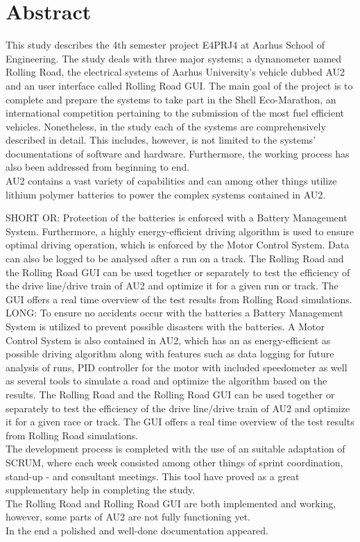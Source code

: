 \chapter{Abstract}
This study describes the 4th semester project E4PRJ4 at Aarhus School of Engineering. The study deals with three major systems; a dynanometer named Rolling Road, the electrical systems of Aarhus University's vehicle dubbed AU2 and an user interface called Rolling Road GUI. The main goal of the project is to complete and prepare the systems to take part in the Shell Eco-Marathon, an international competition pertaining to the submission of the most fuel efficient vehicles. Nonetheless, in the study each of the systems are comprehensively described in detail. This includes, however, is not limited to the systems' documentations of  software and hardware. Furthermore, the working process has also been addressed from beginning to end. \\
AU2 contains a vast variety of capabilities and can among other things utilize lithium polymer batteries to power the complex systems contained in AU2.

SHORT OR:
Protection of the batteries is enforced with a Battery Management System. Furthermore, a highly energy-efficient driving algorithm is used to ensure optimal driving operation, which is enforced by the Motor Control System. Data can also be logged to be analysed after a run on a track.
The Rolling Road and the Rolling Road GUI can be used together or separately to test the efficiency of the drive line/drive train of AU2 and optimize it for a given run or track. The GUI offers a real time overview of the test results from Rolling Road simulations.\\

LONG:
To ensure no accidents occur with the batteries a Battery Management System is utilized to prevent possible disasters with the batteries. A Motor Control System is also contained in AU2, which has an as energy-efficient as possible driving algorithm along with features such as data logging for future analysis of runs, PID controller for the motor with included speedometer as well as several tools to simulate a road and optimize the algorithm based on the results. The Rolling Road and the Rolling Road GUI can be used together or separately to test the efficiency of the drive line/drive train of AU2 and optimize it for a given race or track. The GUI offers a real time overview of the test results from Rolling Road simulations.\\

The development process is completed with the use of an suitable adaptation of SCRUM, where each week consisted among other things of sprint coordination, stand-up - and consultant meetings. This tool have proved as a great
supplementary help in completing the study.\\
The Rolling Road and Rolling Road GUI are both implemented and working, however, some parts of AU2 are not fully functioning yet. \\

In the end a polished and well-done documentation appeared.